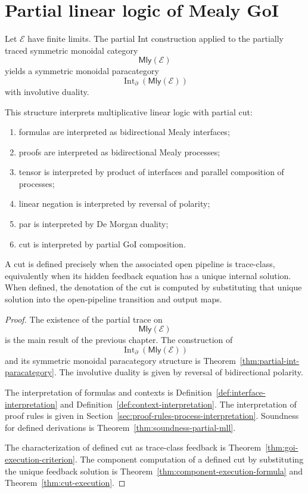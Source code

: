 \section{Partial linear logic of Mealy GoI}
\label{sec:partial-linear-logic-mealy-goi}

\begin{theorem}
\label{thm:partial-linear-logic-mealy-goi}
Let \(\mathcal E\) have finite limits.  The partial Int construction applied
to the partially traced symmetric monoidal category
\[
\mathsf{Mly}(\mathcal E)
\]
yields a symmetric monoidal paracategory
\[
\operatorname{Int}_{\partial}(\mathsf{Mly}(\mathcal E))
\]
with involutive duality.

This structure interprets multiplicative linear logic with partial cut:
\begin{enumerate}
\item formulas are interpreted as bidirectional Mealy interfaces;
\item proofs are interpreted as bidirectional Mealy processes;
\item tensor is interpreted by product of interfaces and parallel composition
of processes;
\item linear negation is interpreted by reversal of polarity;
\item par is interpreted by De Morgan duality;
\item cut is interpreted by partial GoI composition.
\end{enumerate}
A cut is defined precisely when the associated open pipeline is trace-class,
equivalently when its hidden feedback equation has a unique internal solution.
When defined, the denotation of the cut is computed by substituting that unique
solution into the open-pipeline transition and output maps.
\end{theorem}

\begin{proof}
The existence of the partial trace on
\[
\mathsf{Mly}(\mathcal E)
\]
is the main result of the previous chapter.  The construction of
\[
\operatorname{Int}_{\partial}(\mathsf{Mly}(\mathcal E))
\]
and its symmetric monoidal paracategory structure is
Theorem~\ref{thm:partial-int-paracategory}.  The involutive duality is given
by reversal of bidirectional polarity.

The interpretation of formulas and contexts is
Definition~\ref{def:interface-interpretation} and
Definition~\ref{def:context-interpretation}.  The interpretation of proof
rules is given in Section~\ref{sec:proof-rules-process-interpretation}.
Soundness for defined derivations is Theorem~\ref{thm:soundness-partial-mll}.

The characterization of defined cut as trace-class feedback is
Theorem~\ref{thm:goi-execution-criterion}.  The component computation of a
defined cut by substituting the unique feedback solution is
Theorem~\ref{thm:component-execution-formula} and
Theorem~\ref{thm:cut-execution}.
\end{proof}

